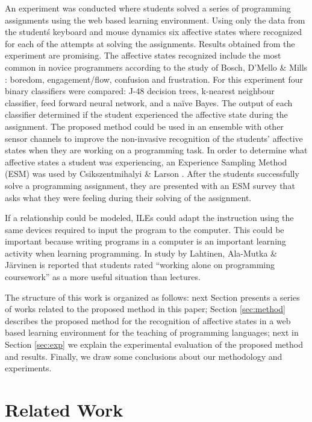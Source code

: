 \documentclass[a4paper,twoside]{article}
\begin{document}
An experiment was conducted where students solved a series of programming
assignments using the web based learning environment. Using only the data from the student\'s keyboard and mouse dynamics six affective states where recognized for each of the attempts at solving the assignments. Results obtained from the experiment are promising. The affective states recognized include the most common in novice programmers according to the study of Bosch, D'Mello \& Mills \cite{bixler2013detecting}: boredom, engagement/flow, confusion and frustration. For this experiment
four binary classifiers were compared: J-48 decision trees, k-nearest neighbour
classifier, feed forward neural network, and a na\"ive Bayes. The output of each
classifier determined if the student experienced the affective state during the
assignment.
The proposed method could be used in an ensemble with other sensor
channels to improve the non-invasive recognition of the students’ affective
states when they are working on a programming task.
In order to determine what
affective states a student was experiencing, an Experience Sampling Method (ESM)
was used by Csikszentmihalyi \& Larson \cite{kubey1996experience}. After the students successfully
solve a programming assignment, they are presented with an ESM survey that asks
what they were feeling during their solving of the assignment.

If a relationship could be modeled, ILEs could adapt the instruction using the
same devices required to input the program to the computer. This could be
important because writing programs in a computer is an important learning
activity when learning programming. In study by Lahtinen, Ala-Mutka \& Järvinen
\cite{lahtinen2005study} is reported that students rated ``working alone on programming coursework'' as a more useful situation than lectures.

The structure of this work is organized as follows: next Section
presents a series of works related to the proposed method in this paper; Section
\ref{sec:method} describes the proposed method for the recognition of affective
states in a web based learning environment for the teaching of programming
languages; next in Section \ref{sec:exp} we explain the experimental evaluation of the
proposed method and results.
Finally, we draw some conclusions about our methodology and
experiments.


\section{Related Work}
\end{document}
